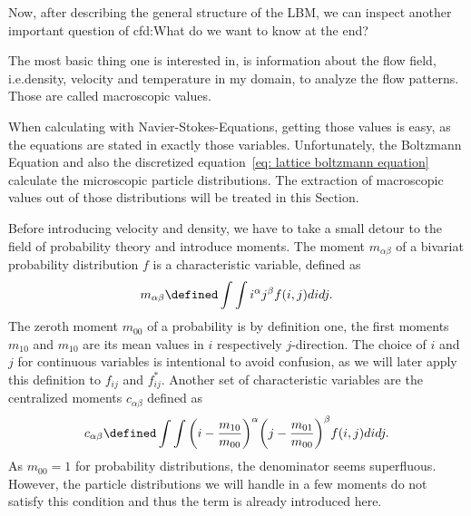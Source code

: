 Now, after describing the general structure of the LBM, we can inspect another important question of \gls{cfd}:\@ What do we want to know at the end?

The most basic thing one is interested in, is information about the flow field, i.e.\@ density, velocity and temperature in my domain, to analyze the flow patterns.
Those are called macroscopic values.

When calculating with Navier-Stokes-Equations, getting those values is easy, as the equations are stated in exactly those variables.
Unfortunately, the Boltzmann Equation and also the discretized equation~\eqref{eq: lattice boltzmann equation} calculate the microscopic particle distributions. The extraction of macroscopic values out of those distributions will be treated in this Section.

Before introducing velocity and density, we have to take a small detour to the field of probability theory and introduce moments. The moment $m_{\alpha\beta}$ of a bivariat probability distribution $f$ is a characteristic variable, defined as
\begin{equation}
  m_{\alpha\beta} \defined \int\int i^\alpha j^\beta f(i,j) didj.
\end{equation}
The zeroth moment $m_{00}$ of a probability is by definition one, the first moments $m_{10}$ and $m_{10}$ are its mean values in $i$ respectively $j$-direction. The choice of $i$ and $j$ for continuous variables is intentional to avoid confusion, as we will later apply this definition to $f_{ij}$ and $f_{ij}^*$.
Another set of characteristic variables are the centralized moments $c_{\alpha\beta}$ defined as
\begin{equation}
  c_{\alpha\beta} \defined \int\int {\left(i - \frac{m_{10}}{m_{00}}\right)}^\alpha {\left(j-\frac{m_{01}}{m_{00}}\right)}^\beta f(i,j) didj.
\end{equation}
As $m_{00}=1$ for probability distributions, the denominator seems superfluous. However, the particle distributions we will handle in a few moments do not satisfy this condition and thus the term is already introduced here.

